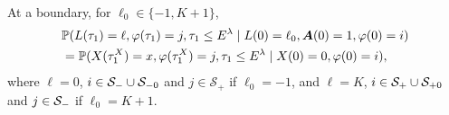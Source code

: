 \begin{cor}
\begin{align}
	\end{align}
	At a boundary, for \(\ell_0\in\{-1,K+1\}\), 
	\begin{align}
		&\mathbb P(L(\tau_1) = \ell, \varphi(\tau_1) = j, \tau_{1}\leq E^\lambda 
            	 \mid L(0) = \ell_{0},\boldsymbol A(0)=1, \varphi(0) = i) \nonumber
		\\&= \mathbb P(X(\tau_1^X) = x, \varphi(\tau_1^X) = j, \tau_{1}\leq E^\lambda 
            	 \mid X(0) = 0, \varphi(0) = i), \label{eqn: lk78GHJK}
	\end{align}
	where \(\ell = 0\), \(i\in\mathcal{S}_-\cup\mathcal{S}_{-0}\) and \(j\in\mathcal S_+\) if \(\ell_0=-1\), and \(\ell = K\), \(i\in\mathcal{S}_+\cup\mathcal{S}_{+0}\) and \(j\in\mathcal{S}_-\) if \(\ell_0=K+1\).  
\end{cor}
